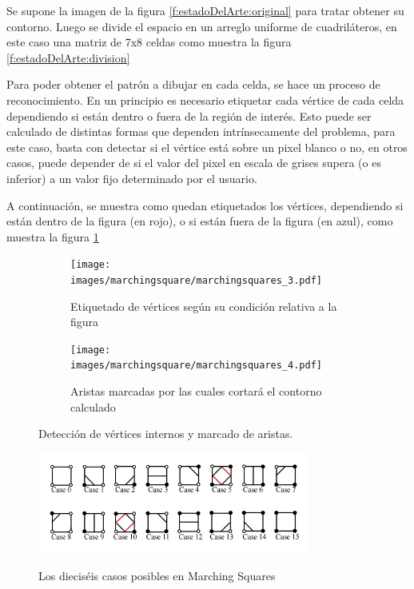 Se supone la imagen de la figura \ref{f:estadoDelArte:original} para tratar obtener su contorno. Luego se divide el espacio en un arreglo uniforme de cuadriláteros, en este caso una
matriz de 7x8 celdas como muestra la figura \ref{f:estadoDelArte:division}

Para poder obtener el patrón a dibujar en cada celda, se hace un proceso de
reconocimiento. En un principio es necesario etiquetar cada vértice de cada celda dependiendo si
están dentro o fuera de la región de interés. Esto puede ser calculado de distintas formas que
dependen intrínsecamente del problema, para este caso, basta con detectar si el vértice está sobre
un pixel blanco o no, en otros casos, puede depender de si el valor del pixel en escala de
grises supera (o es inferior) a un valor fijo determinado por el usuario.

A continuación, se muestra como quedan etiquetados los vértices, dependiendo si están
dentro de la figura (en rojo), o si están fuera de la figura (en azul), como muestra la figura \ref{f:estadoDelArte:labeledobj}

\newpage
\begin{figure}[h]

	\begin{subfigure}[h]{0.46\textwidth}
		\centering
			\texttt{[image: images/marchingsquare/marchingsquares\_3.pdf]}
		\caption{Etiquetado de vértices según su condición relativa a la figura}
		\label{f:estadoDelArte:labeledobj}
	\end{subfigure}
	\quad
	\begin{subfigure}[h]{0.46\textwidth}
		\centering
			\texttt{[image: images/marchingsquare/marchingsquares\_4.pdf]}
		\caption{Aristas marcadas por las cuales cortará el contorno calculado}
		\label{f:estadoDelArte:purpledobj}
	\end{subfigure}

	\caption{Detección de vértices internos y marcado de aristas.}

\end{figure}

\begin{figure}[h]
\centering
	\fbox
	{
		\includegraphics[width=0.8\textwidth]{images/marchingsquare/cases.jpg}
	}
\caption{Los dieciséis casos posibles en Marching Squares}
\label{f:estadoDelArte:cases}
\end{figure}

